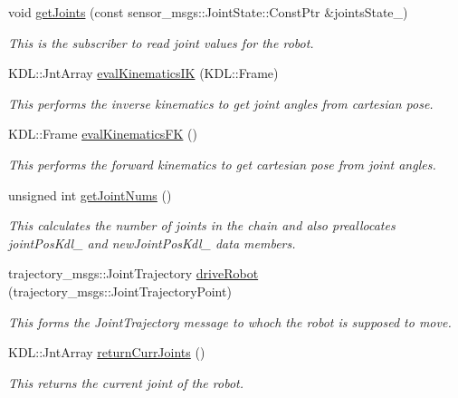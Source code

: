 \begin{DoxyCompactItemize}
void \hyperlink{classkuka_ab7ce79e8daaf42e58c7427c6ea885b59}{get\+Joints} (const sensor\+\_\+msgs\+::\+Joint\+State\+::\+Const\+Ptr \&joints\+State\+\_\+)
\begin{DoxyCompactList}\small\item\em This is the subscriber to read joint values for the robot. \end{DoxyCompactList}\item 
K\+D\+L\+::\+Jnt\+Array \hyperlink{classkuka_a3075c7d636fbc0f0d5629492a369c23a}{eval\+Kinematics\+IK} (K\+D\+L\+::\+Frame)
\begin{DoxyCompactList}\small\item\em This performs the inverse kinematics to get joint angles from cartesian pose. \end{DoxyCompactList}\item 
K\+D\+L\+::\+Frame \hyperlink{classkuka_a8886abcfe2aaf33b778a88834f03d6b6}{eval\+Kinematics\+FK} ()
\begin{DoxyCompactList}\small\item\em This performs the forward kinematics to get cartesian pose from joint angles. \end{DoxyCompactList}\item 
unsigned int \hyperlink{classkuka_a6c6f27f87873fd6d444e1f9878c36c93}{get\+Joint\+Nums} ()
\begin{DoxyCompactList}\small\item\em This calculates the number of joints in the chain and also preallocates joint\+Pos\+Kdl\+\_\+ and new\+Joint\+Pos\+Kdl\+\_\+ data members. \end{DoxyCompactList}\item 
trajectory\+\_\+msgs\+::\+Joint\+Trajectory \hyperlink{classkuka_af7cb1ea174f84bc7a38cb3196396e266}{drive\+Robot} (trajectory\+\_\+msgs\+::\+Joint\+Trajectory\+Point)
\begin{DoxyCompactList}\small\item\em This forms the Joint\+Trajectory message to whoch the robot is supposed to move. \end{DoxyCompactList}\item 
K\+D\+L\+::\+Jnt\+Array \hyperlink{classkuka_a44a8b59602c01cbf7606410871de7266}{return\+Curr\+Joints} ()
\begin{DoxyCompactList}\small\item\em This returns the current joint of the robot. \end{DoxyCompactList}\end{DoxyCompactItemize}


